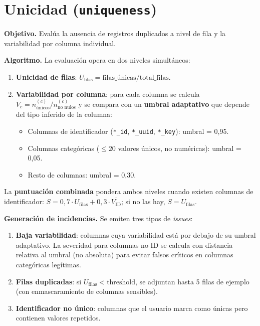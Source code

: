 \section{Unicidad (\texttt{uniqueness})}
\label{sec:met-unicidad}

\textbf{Objetivo.}\quad
Evalúa la ausencia de registros duplicados a nivel de fila y la variabilidad
por columna individual.

\textbf{Algoritmo.}\quad
La evaluación opera en dos niveles simultáneos:

\begin{enumerate}
  \item \textbf{Unicidad de filas}: $U_{\text{filas}} =
        \text{filas\_únicas} / \text{total\_filas}$.
  \item \textbf{Variabilidad por columna}: para cada columna se calcula
        $V_c = n_{\text{únicos}}^{(c)} / n_{\text{no nulos}}^{(c)}$
        y se compara con un \textbf{umbral adaptativo} que depende del tipo
        inferido de la columna:
        \begin{itemize}
          \item Columnas de identificador (\texttt{*\_id}, \texttt{*\_uuid},
                \texttt{*\_key}): umbral = 0,95.
          \item Columnas categóricas ($\leq 20$ valores únicos, no numéricas):
                umbral = 0,05.
          \item Resto de columnas: umbral = 0,30.
        \end{itemize}
\end{enumerate}

La \textbf{puntuación combinada} pondera ambos niveles cuando existen
columnas de identificador:
$S = 0{,}7 \cdot U_{\text{filas}} + 0{,}3 \cdot \overline{V_{\text{ID}}}$;
si no las hay, $S = U_{\text{filas}}$.

\textbf{Generación de incidencias.}\quad
Se emiten tres tipos de \emph{issues}:
\begin{enumerate}
  \item \textbf{Baja variabilidad}: columnas cuya variabilidad está por debajo
        de su umbral adaptativo.  La severidad para columnas no-ID se calcula
        con distancia relativa al umbral (no absoluta) para evitar falsos
        críticos en columnas categóricas legítimas.
  \item \textbf{Filas duplicadas}: si $U_{\text{filas}} < \text{threshold}$, se
        adjuntan hasta 5 filas de ejemplo (con enmascaramiento de columnas
        sensibles).
  \item \textbf{Identificador no único}: columnas que el usuario marca como
        únicas pero contienen valores repetidos.
\end{enumerate}

